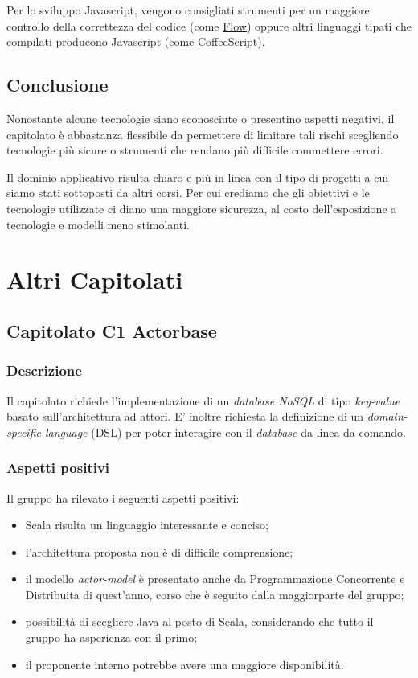 \documentclass[12pt,a4paper]{article}
\begin{document}
Per lo sviluppo Javascript, vengono consigliati strumenti per un maggiore controllo della correttezza del
codice (come \href{http://flowtype.org}{Flow}) oppure altri linguaggi tipati che compilati producono Javascript
(come \href{http://coffeescript.org}{CoffeeScript}).

\subsection{Conclusione}

Nonostante alcune tecnologie siano sconosciute o presentino aspetti negativi, il capitolato è abbastanza flessibile
da permettere di limitare tali rischi scegliendo tecnologie più sicure o strumenti che rendano più difficile commettere
errori.

Il dominio applicativo risulta chiaro e più in linea con il tipo di progetti a cui siamo stati sottoposti da altri corsi. 
Per cui crediamo che gli obiettivi e le tecnologie utilizzate
ci diano una maggiore sicurezza, al costo dell'esposizione a tecnologie e modelli meno stimolanti.

\newpage
\section{Altri Capitolati}

\subsection{Capitolato C1 Actorbase}
\subsubsection{Descrizione}

Il capitolato richiede l'implementazione di un \textit{database NoSQL} di tipo \textit{key-value} basato
sull'architettura ad attori. E' inoltre richiesta la definizione di un \textit{domain-specific-language} (DSL)
per poter interagire con il \textit{database} da linea da comando.

\subsubsection{Aspetti positivi}

Il gruppo ha rilevato i seguenti aspetti positivi:

\begin{itemize}
\item Scala risulta un linguaggio interessante e conciso;
\item l'architettura proposta non è di difficile comprensione;
\item il modello \textit{actor-model} è presentato anche da Programmazione Concorrente e Distribuita di quest'anno, corso che è seguito dalla maggiorparte del gruppo;
\item possibilità di scegliere Java al posto di Scala, considerando che tutto il gruppo ha asperienza con il primo;
\item il proponente interno potrebbe avere una maggiore disponibilità.
\end{itemize}
\end{document}
